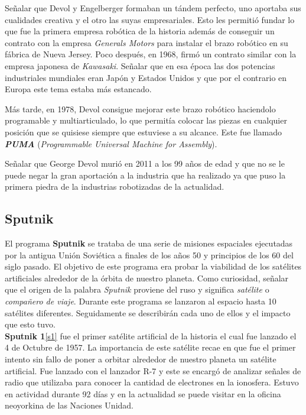 Señalar que Devol y  Engelberger formaban un tándem perfecto, uno aportaba sus cualidades creativa y el otro las suyas empresariales. Esto les permitió fundar lo que fue la primera empresa robótica de la historia además de conseguir un contrato con la empresa \textit{Generals Motors} para instalar el brazo robótico en su fábrica de Nueva Jersey. Poco después, en 1968, firmó un contrato similar con la empresa japonesa de \textit{Kawasaki}. Señalar que en esa época las dos potencias industriales mundiales eran Japón y Estados Unidos y que por el contrario en Europa este tema estaba más estancado.

Más tarde, en 1978, Devol consigue mejorar este brazo robótico haciendolo programable y multiarticulado, lo que permitía colocar las piezas en cualquier posición que se quisiese siempre que estuviese a su alcance. Este fue llamado \textbf{\textit{PUMA}} (\textit{Programmable Universal Machine for Assembly}).

Señalar que George Devol murió en 2011 a los 99 años de edad y que no se le puede negar la gran aportación a la industria que ha realizado ya que puso la primera piedra de la industrias robotizadas de la actualidad.






\subsection{Sputnik}

El programa \textbf{Sputnik} se trataba de una serie de misiones espaciales ejecutadas por la antigua Unión Soviética a finales de los años 50 y principios de los 60 del siglo pasado. El objetivo de este programa era probar la viabilidad de los satélites artificiales alrededor de la órbita de nuestro planeta.
Como curiosidad, señalar que el origen de la palabra \textit{Sputnik} proviene del ruso y significa \textit{satélite} o \textit{compañero de viaje}.
Durante este programa se lanzaron al espacio hasta 10 satélites diferentes. Seguidamente se describirán cada uno de ellos y el impacto que esto tuvo.\\


\textbf{Sputnik 1}\ref{s1} fue el primer satélite artificial de la historia el cual fue lanzado el 4 de Octubre de 1957. La importancia de este satélite recae en que fue el primer intento sin fallo de poner a orbitar alrededor de nuestro planeta un satélite artificial. Fue lanzado con el lanzador R-7 y este se encargó de analizar señales de radio que utilizaba para conocer la cantidad de electrones en la ionosfera. Estuvo en actividad durante 92 días y en la actualidad se puede visitar en la oficina neoyorkina de las Naciones Unidad.\\ 


